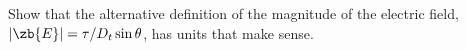         Show that the alternative definition of the magnitude of the electric field,
        $|\zb{E}|=\tau/D_t\sin\theta$, has units that make sense.
